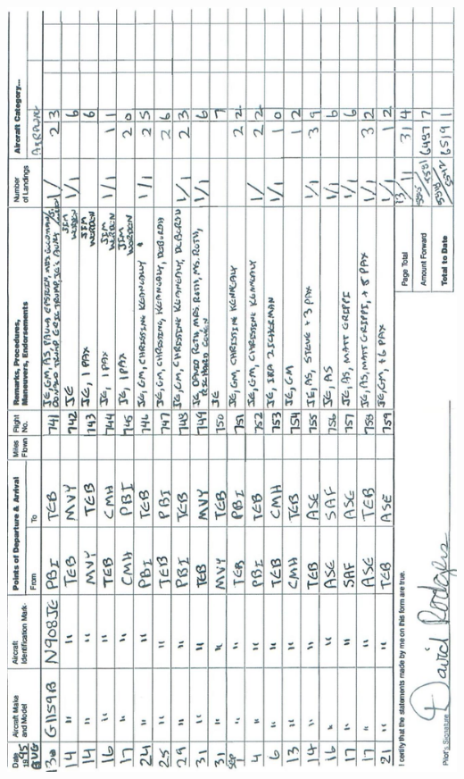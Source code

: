 \documentclass[10pt]{article}
\begin{document}
\includegraphics[max width=\textwidth, center]{2025_02_27_dd68c3d38de88f0516d9g-041}\\
\end{document}
